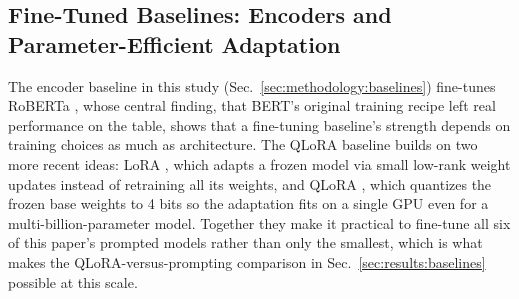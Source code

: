 \subsection{Fine-Tuned Baselines: Encoders and Parameter-Efficient
Adaptation}
\label{sec:related:baselines}

The encoder baseline in this study
(Sec.~\ref{sec:methodology:baselines}) fine-tunes RoBERTa
\cite{liu2019roberta}, whose central finding, that BERT's original
training recipe left real performance on the table, shows that a
fine-tuning baseline's strength depends on training choices as much as
architecture. The QLoRA baseline builds on two more recent ideas: LoRA
\cite{hu2021lora}, which adapts a frozen model via small low-rank weight
updates instead of retraining all its weights, and QLoRA
\cite{dettmers2023qlora}, which quantizes the frozen base weights to 4
bits so the adaptation fits on a single GPU even for a
multi-billion-parameter model. Together they make it practical to
fine-tune all six of this paper's prompted models rather than only the
smallest, which is what makes the QLoRA-versus-prompting comparison in
Sec.~\ref{sec:results:baselines} possible at this scale.
